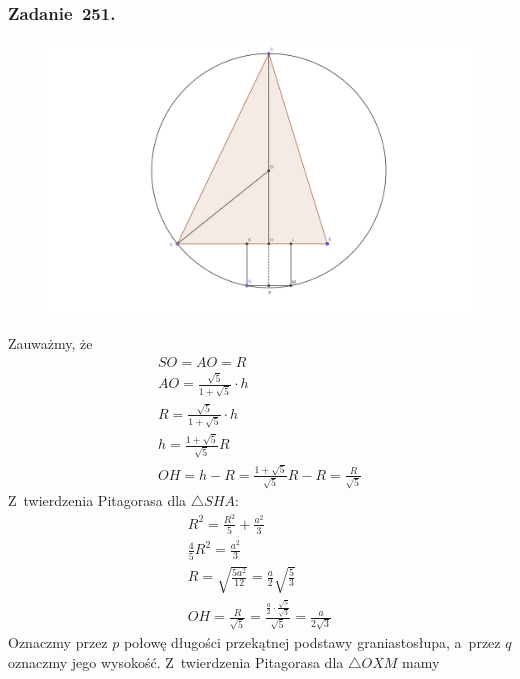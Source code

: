 \subsubsection*{Zadanie~251.}
\begin{figure}[H]
    \centering
    \includegraphics[width=\textwidth]{img/2021_03_02/251/space.png}
\end{figure}
\noindent
Zauważmy, że
\begin{gather*}
    SO = AO = R\\
    AO = \frac{\sqrt{5}}{1 + \sqrt{5}} \cdot h\\
    R = \frac{\sqrt{5}}{1 + \sqrt{5}} \cdot h\\
    h = \frac{1 + \sqrt{5}}{\sqrt{5}}R\\
    OH
    = h - R
    = \frac{1 + \sqrt{5}}{\sqrt{5}}R - R
    = \frac{R}{\sqrt{5}}
\end{gather*}
Z~twierdzenia Pitagorasa dla \(\triangle{SHA}\):
\begin{gather*}
    R^2 = \frac{R^2}{5} + \frac{a^2}{3}\\
    \frac{4}{5}R^2 = \frac{a^2}{3}\\
    R = \sqrt{\frac{5a^2}{12}} = \frac{a}{2}\sqrt{\frac{5}{3}}\\
    OH
    = \frac{R}{\sqrt{5}}
    = \frac{\frac{a}{2} \cdot \frac{\sqrt{5}}{\sqrt{3}}}{\sqrt{5}}
    = \frac{a}{2\sqrt{3}}
\end{gather*}
Oznaczmy przez \(p\) połowę długości przekątnej podstawy graniastosłupa, a~przez \(q\) oznaczmy jego wysokość. Z~twierdzenia Pitagorasa dla \(\triangle{OXM}\) mamy
